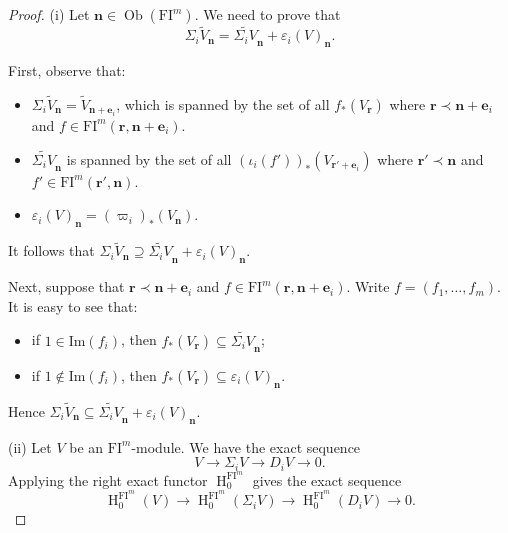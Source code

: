 \documentclass{amsart}
\numberwithin{equation}{section}
\DeclareMathOperator{\HH}{H}
\DeclareMathOperator{\Ob}{Ob}
\newcommand{\FI}{{\mathrm{FI}}}
\begin{document}
\begin{proof}
(i) Let $\mathbf{n}\in\Ob(\FI^m)$. We need to prove that
\[
   \Sigma_i \widetilde{V}_{\mathbf{n}} = \widetilde{\Sigma_i V}_{\mathbf{n}} + \varepsilon_i (V)_{\mathbf{n}}.
\]

First, observe that: 
\begin{itemize}
\item 
$\Sigma_i \widetilde{V}_{\mathbf{n}}=\widetilde{V}_{\mathbf{n}+\mathbf{e}_i}$, which is spanned by the set of all $f_*(V_{\mathbf{r}})$ where $\mathbf{r}\prec \mathbf{n}+\mathbf{e}_i$ and $f\in \FI^m(\mathbf{r}, \mathbf{n}+\mathbf{e}_i)$. 

\item 
$ \widetilde{\Sigma_i V}_{\mathbf{n}}$ is spanned by the set of all $(\iota_i(f'))_*(V_{\mathbf{r'}+\mathbf{e}_i})$ where $\mathbf{r'}\prec \mathbf{n}$ and $f'\in \FI^m(\mathbf{r'}, \mathbf{n})$.

\item
$\varepsilon_i (V)_{\mathbf{n}}=(\varpi_i)_* (V_{\mathbf{n}})$.
\end{itemize}
It follows that $\Sigma_i \widetilde{V}_{\mathbf{n}} \supseteq \widetilde{\Sigma_i V}_{\mathbf{n}} + \varepsilon_i (V)_{\mathbf{n}}$.

Next, suppose that $\mathbf{r}\prec \mathbf{n}+\mathbf{e}_i$ and $f\in \FI^m(\mathbf{r}, \mathbf{n}+\mathbf{e}_i)$. Write $f=(f_1, \ldots, f_m)$. It is easy to see that: 
\begin{itemize}
\item
if $1\in \mathrm{Im}(f_i)$, then $f_*(V_{\mathbf{r}})\subseteq \widetilde{\Sigma_i V}_{\mathbf{n}}$; 

\item 
if $1\notin \mathrm{Im}(f_i)$, then $f_*(V_{\mathbf{r}})\subseteq \varepsilon_i (V)_{\mathbf{n}}$. 
\end{itemize}
Hence $\Sigma_i \widetilde{V}_{\mathbf{n}} \subseteq \widetilde{\Sigma_i V}_{\mathbf{n}} + \varepsilon_i (V)_{\mathbf{n}}$. 

(ii) Let $V$ be an $\FI^m$-module. We have the exact sequence 
\[ V\to \Sigma_i V \to D_i V \to 0. \]
Applying the right exact functor $\HH^{\FI^m}_0$ gives the exact sequence 
\begin{equation} \label{eq:lem_1_a}
   \HH^{\FI^m}_0 (V) \to \HH^{\FI^m}_0 (\Sigma_i V) \to \HH^{\FI^m}_0 (D_i V) \to 0. 
\end{equation}


\end{proof}
\end{document}
